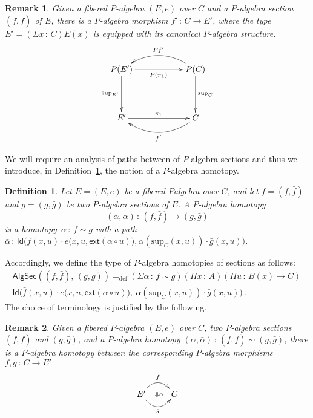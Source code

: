 \documentclass[10pt,a4paper,oneside,reqno]{amsart}
\theoremstyle{mythm}
\theoremstyle{mydef}
\newtheorem{definition}[theorem]{Definition}
\theoremstyle{myrmk}
\newtheorem*{remark*}{Remark}
\newcommand{\defeq}{=_{\mathrm{def}}}
\newcommand{\co}{\,{:}\,}
\newcommand{\ct}{\cdot}
\newcommand{\ext}{\mathsf{ext}}
\newcommand{\Id}{\mathsf{Id}}
\renewcommand{\sup}{\mathrm{sup}}
\newcommand{\AlgSecHot}{\mathsf{AlgSec}}
\begin{document}
\begin{remark*}
Given a fibered $P$-algebra $(E, e)$ over $C$ and a $P$-algebra section $(f, \bar{f})$ of $E$, there is a $P$-algebra 
morphism $f' \co C \to E'$, where the type $E' = (\Sigma x \co C) E(x)$ is equipped with its canonical 
$P$-algebra structure. 
\[
\xymatrix@C=2cm@R=1.5cm{
P(E')  \ar[d]_-{\sup_{E'}}   \ar[r]_{P(\pi_1)}   & P(C)  \ar[d]^-{\sup_C}   \ar@/_1.4pc/[l]_{Pf'}  \\ 
E'  \ar[r]^{\pi_1}    & C \ar@/^1.4pc/[l]^{f'} }
 \]
\end{remark*}



We will require an analysis of paths between of $P$-algebra sections and thus we introduce, in Definition~\ref{def:W2cellsection}, the
notion of a $P$-algebra homotopy.

\begin{definition} \label{def:W2cellsection} Let $E = (E, e)$ be a fibered $P$algebra over $C$, and let $f = (f, \bar{f})$ and $g = (g, \bar{g})$ be two $P$-algebra sections of $E$.  A \emph{$P$-algebra homotopy} 
\[
(\alpha , \bar{\alpha}) \co (f, \bar{f})  \rightarrow (g, \bar{g})
\] 
is a homotopy~$\alpha \co f \sim g$ with a path
$\bar{\alpha} \co 
\Id\big( \bar{f}(x,u)  \ct e\big(x,u, \ext (\alpha \circ u) \big),
\alpha(\sup_C(x,u)) \ct \bar{g}(x,u) \big)$. 
\end{definition} 

Accordingly, we define the type of $P$-algebra homotopies of sections as follows:
\begin{multline*}
\AlgSecHot( (f, \bar{f}) ,\, (g, \bar{g}) )  \defeq 
(\Sigma \alpha \co f \sim g) 
(\Pi x \co A) 
(\Pi u \co B(x) \to C) \, \\ 
\Id\big( \bar{f}(x,u)  \ct e \big(x,u, \ext (\alpha \circ u) \big),\ 
\alpha(\sup_C(x,u)) \ct \bar{g}(x,u) \big) \, .
\end{multline*}
The choice of terminology is justified by the following.

\begin{remark*} 
Given a fibered $P$-algebra $(E, e)$ over $C$, two $P$-algebra sections $(f, \bar{f})$ and $(g, \bar{g})$, and a 
$P$-algebra homotopy $(\alpha, \bar{\alpha}) \co (f, \bar{f}) \sim (g, \bar{g})$, there is a $P$-algebra homotopy between the corresponding $P$-algebra morphisms $f, g \co C \to E'$ 
\[
\xymatrix{ E' \ar@{}[r]|{\ \Downarrow \alpha}   \ar@/^1.2pc/[r]^{f}  \ar@/_1.2pc/[r]_{g} & C}
 \]
\end{remark*}
\end{document}
